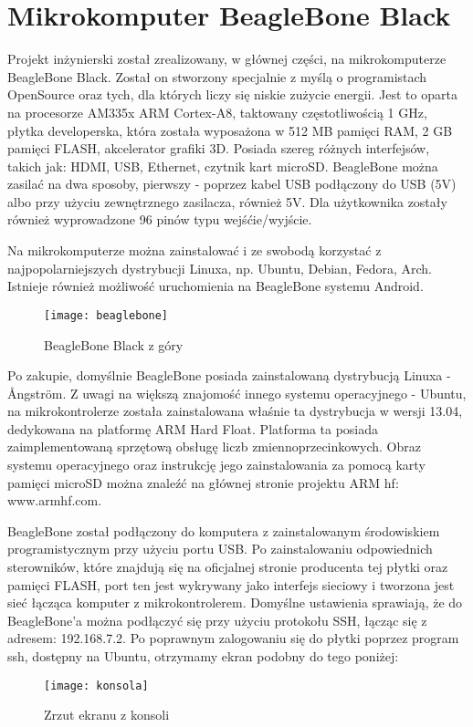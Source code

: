 \chapter{Mikrokomputer BeagleBone Black}
Projekt inżynierski został zrealizowany, w głównej części, na mikrokomputerze BeagleBone Black. Został on stworzony specjalnie z myślą o programistach OpenSource oraz tych, dla których liczy się niskie zużycie energii. Jest to oparta na procesorze AM335x ARM Cortex-A8, taktowany częstotliwością 1 GHz, płytka developerska, która została wyposażona w 512 MB pamięci RAM, 2 GB pamięci FLASH, akcelerator grafiki 3D. Posiada szereg różnych interfejsów, takich jak: HDMI, USB, Ethernet, czytnik kart microSD. BeagleBone można zasilać na dwa sposoby, pierwszy - poprzez kabel USB podłączony do USB (5V) albo przy użyciu zewnętrznego zasilacza, również 5V. Dla użytkownika zostały również wyprowadzone 96 pinów typu wejśćie/wyjście.

Na mikrokomputerze można zainstalować i ze swobodą korzystać z najpopolarniejszych dystrybucji Linuxa, np. Ubuntu, Debian, Fedora, Arch. Istnieje również możliwość uruchomienia na BeagleBone systemu Android.

\begin{figure}[h]
\centering
\texttt{[image: beaglebone]}
\caption{BeagleBone Black z góry}
\label{fig:beaglebone}
\end{figure}

Po zakupie, domyślnie BeagleBone posiada zainstalowaną dystrybucją Linuxa - Ångström. Z uwagi na większą znajomość innego systemu operacyjnego - Ubuntu, na mikrokontrolerze została zainstalowana właśnie ta dystrybucja w wersji 13.04, dedykowana na platformę ARM Hard Float. Platforma ta posiada zaimplementowaną sprzętową obsługę liczb zmiennoprzecinkowych. Obraz systemu operacyjnego oraz instrukcję jego zainstalowania za pomocą karty pamięci microSD można znaleźć na głównej stronie projektu ARM hf: www.armhf.com.

BeagleBone został podłączony do komputera z zainstalowanym środowiskiem programistycznym przy użyciu portu USB. Po zainstalowaniu odpowiednich sterowników, które znajdują się na oficjalnej stronie producenta tej płytki oraz pamięci FLASH, port ten jest wykrywany jako interfejs sieciowy i tworzona jest sieć łącząca komputer z mikrokontrolerem. Domyślne ustawienia sprawiają, że do BeagleBone'a można podłączyć się przy użyciu protokołu SSH, łącząc się z adresem: 192.168.7.2. Po poprawnym zalogowaniu się do płytki poprzez program ssh, dostępny na Ubuntu, otrzymamy ekran podobny do tego poniżej:

\begin{figure}[h]
\centering
\texttt{[image: konsola]}
\caption{Zrzut ekranu z konsoli}
\label{fig:konsola}
\end{figure}